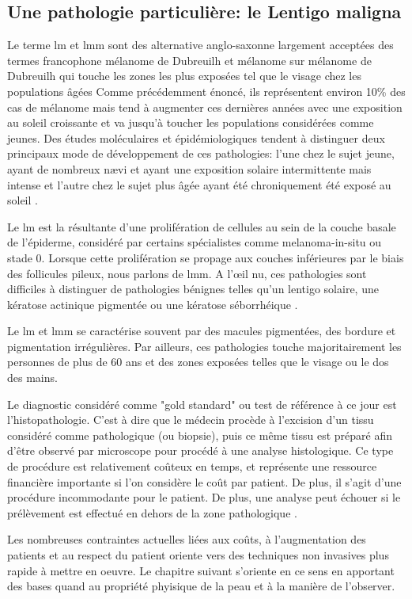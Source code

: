 \subsection{Une pathologie particulière: le Lentigo maligna}
Le terme \gls{lm} et \gls{lmm} sont des alternative anglo-saxonne largement acceptées des termes francophone mélanome de Dubreuilh et mélanome sur mélanome de Dubreuilh qui touche les zones les plus exposées tel que le visage chez les populations âgées Comme précédemment énoncé, ils représentent environ 10\% des cas de mélanome mais tend à augmenter ces dernières années avec une exposition au soleil croissante et va jusqu'à toucher les populations considérées comme jeunes. Des études moléculaires et épidémiologiques tendent à distinguer deux principaux mode de développement de ces pathologies: l'une chez le sujet jeune, ayant de nombreux nævi et ayant une exposition solaire intermittente mais intense et l'autre chez le sujet plus âgée ayant été chroniquement été exposé au soleil \cite{LeGal2011}.\par
Le \gls{lm} est la résultante d'une prolifération de cellules au sein de la couche basale de l'épiderme, considéré par certains spécialistes comme melanoma-in-situ ou stade 0. Lorsque cette prolifération se propage aux couches inférieures par le biais des follicules pileux, nous parlons de \gls{lmm}. A l’œil nu, ces pathologies sont difficiles à distinguer de pathologies bénignes telles qu'un lentigo solaire, une kératose actinique pigmentée ou une kératose séborrhéique \cite{LeGal2011}.\par
Le \gls{lm} et \gls{lmm} se caractérise souvent par des macules pigmentées, des bordure et pigmentation irrégulières. Par ailleurs, ces pathologies touche majoritairement les personnes de plus de 60 ans et des zones exposées telles que le visage ou le dos des mains.\par
Le diagnostic considéré comme "gold standard" ou test de référence à ce jour est l'histopathologie. C'est à dire que le médecin procède à l'excision d'un tissu considéré comme pathologique (ou biopsie), puis ce même tissu est préparé afin d'être observé par microscope pour procédé à une analyse histologique. Ce type de procédure est relativement coûteux en temps, et représente une ressource financière importante si l'on considère le coût par patient. De plus, il s'agit d'une procédure incommodante pour le patient. De plus, une analyse peut échouer si le prélèvement est effectué en dehors de la zone pathologique \cite{LeGal2011}.\par
Les nombreuses contraintes actuelles liées aux coûts, à l'augmentation des patients et au respect du patient oriente vers des techniques non invasives plus rapide à mettre en oeuvre. Le chapitre suivant s'oriente en ce sens en apportant des bases quand au propriété phyisique de la peau et à la manière de l'observer.\par 